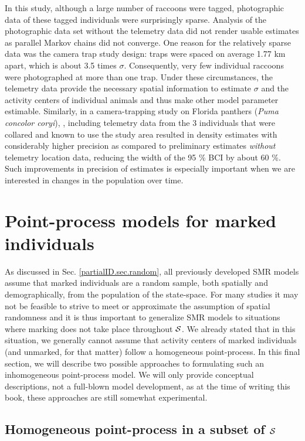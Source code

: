 In this study, although a large number of raccoons were tagged,
photographic data of these tagged individuals were surprisingly
sparse. Analysis of the photographic data set without the telemetry
data did not render usable estimates as parallel Markov chains did not
converge. One reason for the relatively sparse data was the camera
trap study design: traps were spaced on average 1.77 km apart, which
is about 3.5 times $\sigma$. Consequently, very few individual
raccoons were photographed at more than one trap. Under these
circumstances, the telemetry data provide the necessary spatial
information to estimate $\sigma$ and the activity centers of
individual animals and thus make other model parameter
estimable. Similarly, in a camera-trapping study on Florida panthers
(\emph{Puma concolor coryi}), \citet{sollmann_etal:inprepjapplecol},
including telemetry data from the 3 individuals that were collared and
known to use the study area resulted in density estimates with
considerably higher precision as compared to preliminary estimates
\emph{without} telemetry location data, reducing the width of the 95
\% BCI by about 60 \%. Such improvements in precision of estimates is
especially important when we are interested in changes in the
population over time.


\section{Point-process models for marked individuals}

As discussed in Sec. \ref{partialID.sec.random}, all previously
developed SMR models assume that marked individuals are a random
sample, both spatially and demographically, from the population of the
state-space. For many studies it may not be feasible to strive to meet
or approximate the assumption of spatial randomness and it is thus
important to generalize SMR models to situations where marking does
not take place throughout ${\cal S}$. We already stated that in this
situation, we generally cannot assume that activity centers of marked
individuals (and unmarked, for that matter) follow a homogeneous
point-process. In this final section, we will describe two possible
approaches to formulating such an inhomogeneous point-process model. We will
only provide conceptual descriptions, not a full-blown model
development, as at the time of writing this book, these approaches are
still somewhat experimental.


\subsection{Homogeneous point-process in a subset of ${\cal S}$}

